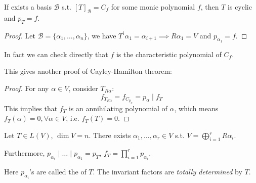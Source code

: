 \begin{proposition}
	If exists a basis $\mathcal{B}$ s.t. $[T]_{\mathcal{B}} = C_f$ for some
	monic polynomial $f$, then $T$ is cyclic and $p_T = f$.
\end{proposition}
\begin{proof}[Proof]
    Let $\mathcal{B} = \{\alpha_1,\dots,\alpha_n\}$,
	we have $T^i \alpha_1 = \alpha_{i + 1} \implies R\alpha_1 = V$ and
	$p_{\alpha_1} = f$.
\end{proof}

\begin{remark}
    In fact we can check directly that $f$ is the
	characteristic polynomial of $C_f$.

	This gives another proof of Cayley-Hamilton theorem: 
	\begin{proof}[Proof]
	    For any $\alpha\in V$, consider $T_{R\alpha}$:
		\[
		f_{T_{R\alpha}} = f_{C_{p_\alpha}} = p_\alpha \mid f_T
		\]
		This implies that $f_T$ is an annihilating polynomial of $\alpha$,
		which means $f_T(\alpha) = 0, \forall \alpha\in V$,
		i.e. $f_T(T) = 0$.
	\end{proof}
\end{remark}

\begin{theorem}
    Let $T\in L(V)$, $\dim V = n$. There exists $\alpha_1,\dots,\alpha_r\in V$
	s.t. $V = \bigoplus_{i=1}^r R\alpha_i$.

	Furthermore, $p_{\alpha_r}\mid\dots\mid p_{\alpha_1} = p_T$,
	$f_T = \prod_{i=1}^r p_{\alpha_i}$.

	Here $p_{\alpha_i}$'s are called the  of $T$.
	The invariant factors are \textit{totally determined} by $T$.
\end{theorem}
